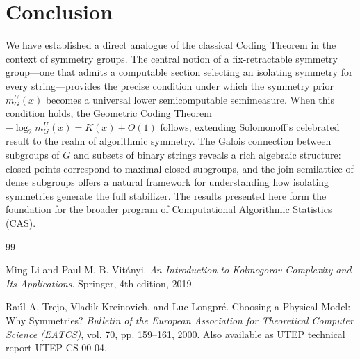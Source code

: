 \documentclass{article}
\newcommand{\ms}{m^U_G}
\begin{document}
\section{Conclusion}
We have established a direct analogue of the classical Coding Theorem in the context of symmetry groups. The central notion of a fix-retractable symmetry group—one that admits a computable section selecting an isolating symmetry for every string—provides the precise condition under which the symmetry prior $\ms(x)$ becomes a universal lower semicomputable semimeasure. When this condition holds, the Geometric Coding Theorem $-\log_2\ms(x) = K(x) + O(1)$ follows, extending Solomonoff's celebrated result to the realm of algorithmic symmetry. The Galois connection between subgroups of $G$ and subsets of binary strings reveals a rich algebraic structure: closed points correspond to maximal closed subgroups, and the join-semilattice of dense subgroups offers a natural framework for understanding how isolating symmetries generate the full stabilizer. The results presented here form the foundation for the broader program of Computational Algorithmic Statistics (CAS).

\begin{thebibliography}{99}

Ming Li and Paul M. B. Vitányi.
\textit{An Introduction to Kolmogorov Complexity and Its Applications}.
Springer, 4th edition, 2019.

Raúl A. Trejo, Vladik Kreinovich, and Luc Longpré.
Choosing a Physical Model: Why Symmetries?
\textit{Bulletin of the European Association for Theoretical Computer Science (EATCS)},
vol. 70, pp. 159–161, 2000.
Also available as UTEP technical report UTEP-CS-00-04.

\end{thebibliography}
\end{document}
